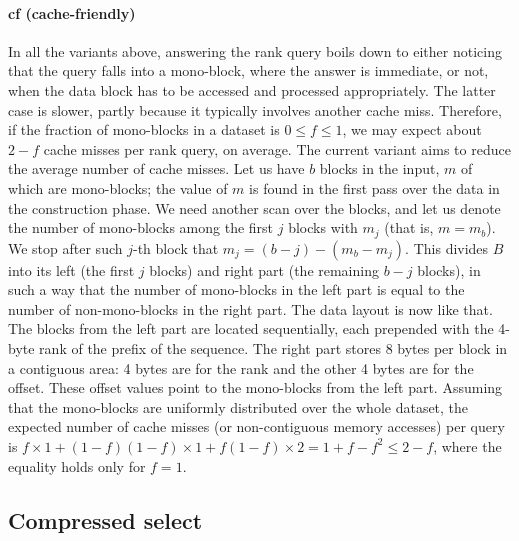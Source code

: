 \documentclass{llncs}
\begin{document}
\paragraph*{\textbf{cf (cache-friendly)}}
In all the variants above, answering the rank query boils down to 
either noticing that the query falls into a mono-block, where the answer 
is immediate, or not, when the data block has to be accessed and processed 
appropriately.
The latter case is slower, partly because it typically involves another 
cache miss.
Therefore, if the fraction of mono-blocks in a dataset is $0 \leq f \leq 1$, 
we may expect about $2 - f$ cache misses per rank query, on average.
The current variant aims to reduce the average number of cache misses.
Let us have $b$ blocks in the input, $m$ of which are mono-blocks; 
the value of $m$ is found in the first pass over the data 
in the construction phase.
We need another scan over the blocks, and let us denote the 
number of mono-blocks among the first $j$ blocks with $m_j$ 
(that is, $m = m_b$).
We stop after such $j$-th block that 
$m_j = (b-j)-(m_b-m_j)$.
This divides $B$ into its left (the first $j$ blocks) 
and right part (the remaining $b-j$ blocks), 
in such a way that the number of mono-blocks in the left part 
is equal 
to the number of non-mono-blocks in the right part.
The data layout is now like that.
The blocks from the left part are located sequentially, 
each prepended with the 4-byte rank of the prefix of the sequence.
The right part stores 8 bytes per block in a contiguous area: 
4 bytes are for the rank and the other 4 bytes are for the offset. 
These offset values point to the mono-blocks from the left part.
Assuming that the mono-blocks are uniformly distributed over the whole 
dataset, the expected number of cache misses 
(or non-contiguous memory accesses) per query is 
$f \times 1 + (1-f)(1-f) \times 1 + f(1-f) \times 2 = 1 + f - f^2 \leq 2 - f$, 
where the equality holds only for $f = 1$.


\subsection{Compressed select}
\label{sec:csel}
\end{document}
